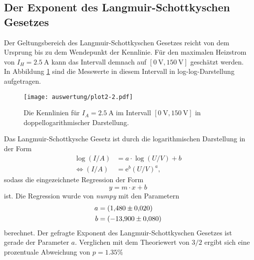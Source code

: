 \subsection{Der Exponent des Langmuir-Schottkyschen Gesetzes}
\label{sec:langschott}
Der Geltungsbereich des Langmuir-Schottkyschen Gesetzes reicht von dem Ursprung bis zu dem Wendepunkt der Kennlinie. Für den maximalen Heizstrom
von $I_H=\SI{2.5}{\ampere}$ kann das Intervall demnach auf $[\SI{0}{\volt}, \SI{150}{\volt}]$ geschätzt werden. In Abbildung \ref{fig:plot2} sind
die Messwerte in diesem Intervall in log-log-Darstellung aufgetragen.
\begin{figure}[H]
    \centering
    \texttt{[image: auswertung/plot2-2.pdf]}
    \caption{Die Kennlinien für $I_A=\SI{2.5}{\ampere}$ im Intervall $[\SI{0}{\volt}, \SI{150}{\volt}]$ in doppellogarithmischer Darstellung.}
    \label{fig:plot2}
\end{figure}
\noindent
Das Langmuir-Schottkysche Gesetz ist durch die logarithmischen Darstellung in der Form
\begin{align*}
    \log(I/A)&=a\cdot \log(U/V)+b\\
    \Leftrightarrow
    (I/A)&=\text{e}^b(U/V)^{a},  %
\end{align*}
sodass die eingezeichnete Regression der Form
\begin{equation}
    y=m\cdot x+b
    \label{eqn:gerade}
\end{equation}
ist. Die Regression wurde von \textit{numpy} \cite{numpy} mit den Parametern
\begin{align*}
    a &= \SI{1.48   \pm 0.020}{} \\
    b &= \SI{-13.90 \pm 0.080}{} %
\end{align*}
berechnet. Der gefragte Exponent des Langmuir-Schottkyschen Gesetzes ist gerade der Parameter $a$. Verglichen mit dem Theoriewert von $3/2$
ergibt sich eine prozentuale Abweichung von $p=\num{1.35}\%$

